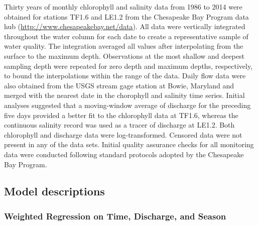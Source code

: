 \documentclass[letterpaper,12pt,oneside]{article}\usepackage[]{graphicx}\usepackage[]{color}
\begin{document}
Thirty years of monthly chlorophyll and salinity data from 1986 to 2014 were obtained for stations TF1.6 and LE1.2 from the Chesapeake Bay Program data hub (\href{http://www.chesapeakebay.net/data}{http://www.chesapeakebay.net/data}).  All data were vertically integrated throughout the water column for each date to create a representative sample of water quality.  The integration averaged all values after interpolating from the surface to the maximum depth. Observations at the most shallow and deepest sampling depth were repeated for zero depth and maximum depths, respectively, to bound the interpolations within the range of the data.  Daily flow data were also obtained from the \ac{USGS} stream gage station at Bowie, Maryland and merged with the nearest date in the chorophyll and salinity time series.  Initial analyses suggested that a moving-window average of discharge for the preceding five days provided a better fit to the chlorophyll data at TF1.6, whereas the continuous salinity record was used as a tracer of discharge at LE1.2.  Both chlorophyll and discharge data were log-transformed.  Censored data were not present in any of the data sets.  Initial quality assurance checks for all monitoring data were conducted following standard protocols adopted by the Chesapeake Bay Program.        

\subsection{Model descriptions}


\subsubsection{Weighted Regression on Time, Discharge, and Season}
\end{document}
